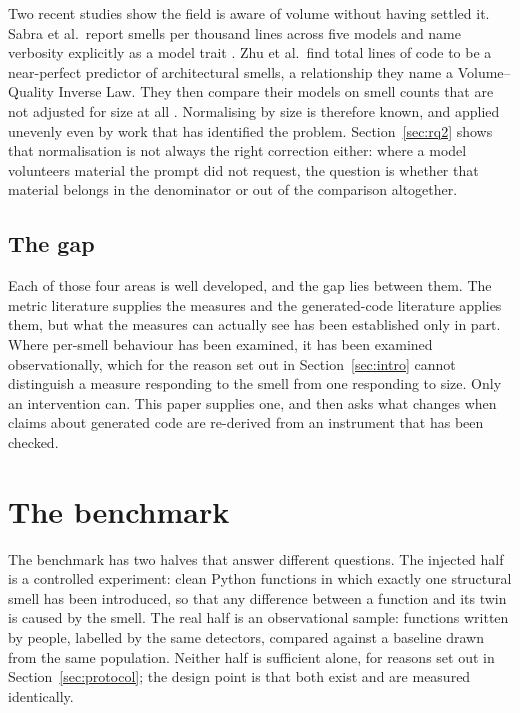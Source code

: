 \documentclass[10pt,a4paper,twocolumn]{article}
\begin{document}
Two recent studies show the field is aware of volume without having settled it.
Sabra et al.\ report smells per thousand lines across five models and name
verbosity explicitly as a model trait \cite{sabra2025assessing}. Zhu et al.\
find total lines of code to be a near-perfect predictor of architectural smells,
a relationship they name a Volume--Quality Inverse Law. They then compare their
models on smell counts that are not adjusted for size at all
\cite{zhu2026aigenerated}. Normalising by size is therefore known, and applied
unevenly even by work that has identified the problem. Section~\ref{sec:rq2}
shows that normalisation is not always the right correction either: where a
model volunteers material the prompt did not request, the question is whether
that material belongs in the denominator or out of the comparison altogether.

\subsection{The gap}
\label{sec:gap}

Each of those four areas is well developed, and the gap lies between them. The
metric literature supplies the measures and the generated-code literature
applies them, but what the measures can actually see has been established only
in part. Where per-smell behaviour has been examined, it has been examined
observationally, which for the reason set out in Section~\ref{sec:intro} cannot
distinguish a measure responding to the smell from one responding to size. Only
an intervention can. This paper supplies one, and then asks what changes when
claims about generated code are re-derived from an instrument that has been
checked.

\section{The benchmark}
\label{sec:benchmark}

The benchmark has two halves that answer different questions. The injected half
is a controlled experiment: clean Python functions in which exactly one
structural smell has been introduced, so that any difference between a function
and its twin is caused by the smell. The real half is an observational sample:
functions written by people, labelled by the same detectors, compared against a
baseline drawn from the same population. Neither half is sufficient alone, for
reasons set out in Section~\ref{sec:protocol}; the design point is that both
exist and are measured identically.
\end{document}

